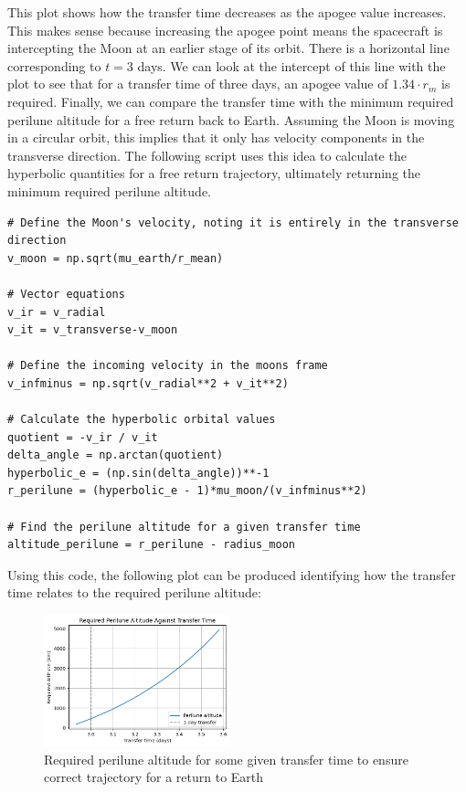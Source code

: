 \documentclass[12pt,twocolumn]{article}  %
\begin{document}
This plot shows how the transfer time decreases as the apogee value increases. This makes sense because increasing the 
apogee point means the spacecraft is intercepting the Moon at an earlier stage of its orbit.
There is a horizontal line corresponding to $t=3$ days. We can look at the intercept of this line with the plot to see that for a 
transfer time of three days, an apogee value of $1.34\cdot r_m$ is required.
\vspace{0.75cm}
\newline
\indent Finally, we can compare the transfer time with the minimum required perilune altitude for a free return back to Earth.
Assuming the Moon is moving in a circular orbit, this implies that it only has velocity components in the transverse direction.
The following script uses this idea to calculate the hyperbolic quantities for a free return trajectory, ultimately returning the 
minimum required perilune altitude.
\begin{lstlisting}
# Define the Moon's velocity, noting it is entirely in the transverse direction
v_moon = np.sqrt(mu_earth/r_mean)

# Vector equations
v_ir = v_radial
v_it = v_transverse-v_moon

# Define the incoming velocity in the moons frame
v_infminus = np.sqrt(v_radial**2 + v_it**2)

# Calculate the hyperbolic orbital values
quotient = -v_ir / v_it
delta_angle = np.arctan(quotient)
hyperbolic_e = (np.sin(delta_angle))**-1
r_perilune = (hyperbolic_e - 1)*mu_moon/(v_infminus**2)

# Find the perilune altitude for a given transfer time
altitude_perilune = r_perilune - radius_moon
\end{lstlisting}

Using this code, the following plot can be produced identifying how the transfer time relates to the required perilune altitude:
\begin{figure}[H]
    \centering
    \includegraphics[width=0.48\textwidth]{Images/223-altitude.png}
    \caption{Required perilune altitude for some given transfer time to ensure correct trajectory for a return to Earth}
\end{figure}
\end{document}
